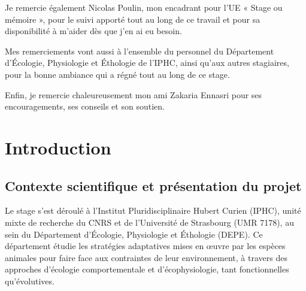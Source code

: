 \documentclass[11pt,a4paper]{report}
\begin{document}
\vspace{0.6cm}

Je remercie également Nicolas Poulin, mon encadrant pour l'UE « Stage ou
mémoire », pour le suivi apporté tout au long de ce travail et pour sa
disponibilité à m'aider dès que j'en ai eu besoin.

\vspace{0.6cm}

Mes remerciements vont aussi à l'ensemble du personnel du Département
d'Écologie, Physiologie et Éthologie de l'IPHC, ainsi qu'aux autres
stagiaires, pour la bonne ambiance qui a régné tout au long de ce stage.

\vspace{0.6cm}

Enfin, je remercie chaleureusement mon ami Zakaria Ennasri pour ses
encouragements, ses conseils et son soutien.

\newpage

\tableofcontents
\thispagestyle{empty}

\newpage


\chapter*{Introduction}

\section*{Contexte scientifique et présentation du projet}

Le stage s'est déroulé à l'Institut Pluridisciplinaire Hubert Curien (IPHC), unité
mixte de recherche du CNRS et de l'Université de Strasbourg (UMR 7178), au sein du
Département d'Écologie, Physiologie et Éthologie (DEPE). Ce département étudie les
stratégies adaptatives mises en \oe uvre par les espèces animales pour faire face aux
contraintes de leur environnement, à travers des approches d'écologie comportementale
et d'écophysiologie, tant fonctionnelles qu'évolutives.
\end{document}
